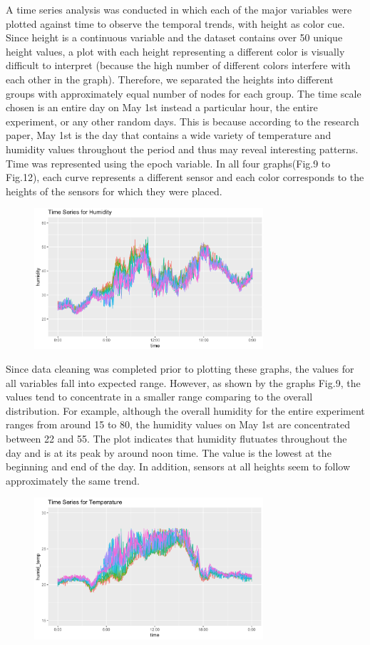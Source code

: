\documentclass[twocolumn,11pt]{asme2ej}
\begin{document}
A time series analysis was conducted in which each of the major variables were plotted against time to observe the temporal trends, with height as color cue. Since height is a continuous variable and the dataset contains over 50 unique height values, a plot with each height representing a different color is visually difficult to interpret (because the high number of different colors interfere with each other in the graph). Therefore, we separated the heights into different groups with approximately equal number of nodes for each group. The time scale chosen is an entire day on May 1st instead a particular hour, the entire experiment, or any other random days. This is because according to the research paper, May 1st is the day that contains a wide variety of temperature and humidity values throughout the period and thus may reveal interesting patterns. Time was represented using the epoch variable. In all four graphs(Fig.9 to Fig.12), each curve represents a different sensor and each color corresponds to the heights of the sensors for which they were placed. 

\begin{figure}
    \centering
    \includegraphics[width=85mm]{3c.png} 
    \caption{}
    \label{fig:3c}
\end{figure}

Since data cleaning was completed prior to plotting these graphs, the values for all variables fall into expected range. However, as shown by the graphs Fig.9, the values tend to concentrate in a smaller range comparing to the overall distribution. For example, although the overall humidity for the entire experiment ranges from around 15 to 80, the humidity values on May 1st are concentrated between 22 and 55. The plot indicates that humidity flutuates throughout the day and is at its peak by around noon time. The value is the lowest at the beginning and end of the day. In addition, sensors at all heights seem to follow approximately the same trend. 

\begin{figure}
    \centering
    \includegraphics[width=85mm]{3c2.png} 
    \caption{}
    \label{fig:3c2}
\end{figure}
\end{document}
